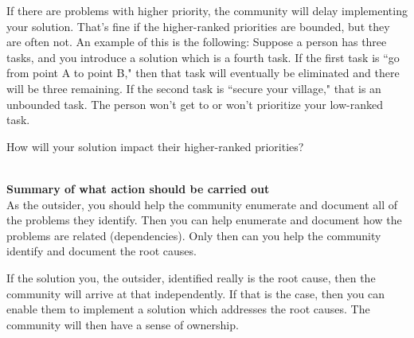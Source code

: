 If there are problems with higher priority, the community will delay implementing your solution. That's fine if the higher-ranked priorities are bounded, but they are often not. An example of this is the following:
Suppose a person has three tasks, and you introduce a solution which is a fourth task.
If the first task is ``go from point A to point B," then that task will eventually be eliminated and there will be three remaining.
If the second task is ``secure your village," that is an unbounded task. The person won't get to or won't prioritize your low-ranked task.

How will your solution impact their higher-ranked priorities?

\ \\

\textbf{Summary of what action should be carried out} \\

As the outsider, you should help the community enumerate and document all of the problems they identify. Then you can help enumerate and document how the problems are related (dependencies). Only then can you help the community identify and document the root causes.

If the solution you, the outsider, identified really is the root cause, then the community will arrive at that independently. If that is the case, then you can enable them to implement a solution which addresses the root causes. The community will then have a sense of ownership.
